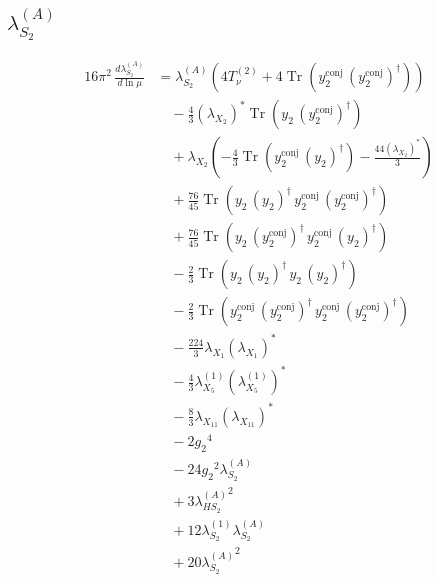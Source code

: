 \documentclass[10pt,a4paper]{article}
\begin{document}
\subsection*{$\lambda_{S_2}^{(A)}$}
\begin{align*}
16\pi^2\,\frac{d \lambda_{S_2}^{(A)}}{d\ln\mu} &={\lambda_{S_2}^{(A)}} (4 T_{\nu}^{(2)}+4 \operatorname{Tr}\!\left({y_{2}^{\mathrm{conj}}}\,\left({y_{2}^{\mathrm{conj}}}\right)^{\dagger}\right)) \\
&\quad -\frac{4}{3} \left({\lambda_{X_{2}}}\right)^{*} \operatorname{Tr}\!\left({y_2}\,\left({y_{2}^{\mathrm{conj}}}\right)^{\dagger}\right) \\
&\quad +{\lambda_{X_{2}}} \left(-\frac{4}{3} \operatorname{Tr}\!\left({y_{2}^{\mathrm{conj}}}\,\left({y_2}\right)^{\dagger}\right)-\frac{44 \left({\lambda_{X_{2}}}\right)^{*}}{3}\right) \\
&\quad +\frac{76}{45} \operatorname{Tr}\!\left({y_2}\,\left({y_2}\right)^{\dagger}\,{y_{2}^{\mathrm{conj}}}\,\left({y_{2}^{\mathrm{conj}}}\right)^{\dagger}\right) \\
&\quad +\frac{76}{45} \operatorname{Tr}\!\left({y_2}\,\left({y_{2}^{\mathrm{conj}}}\right)^{\dagger}\,{y_{2}^{\mathrm{conj}}}\,\left({y_2}\right)^{\dagger}\right) \\
&\quad -\frac{2}{3} \operatorname{Tr}\!\left({y_2}\,\left({y_2}\right)^{\dagger}\,{y_2}\,\left({y_2}\right)^{\dagger}\right) \\
&\quad -\frac{2}{3} \operatorname{Tr}\!\left({y_{2}^{\mathrm{conj}}}\,\left({y_{2}^{\mathrm{conj}}}\right)^{\dagger}\,{y_{2}^{\mathrm{conj}}}\,\left({y_{2}^{\mathrm{conj}}}\right)^{\dagger}\right) \\
&\quad -\frac{224}{3} {\lambda_{X_{1}}} \left({\lambda_{X_{1}}}\right)^{*} \\
&\quad -\frac{4}{3} {\lambda_{X_{5}}^{(1)}} \left({\lambda_{X_{5}}^{(1)}}\right)^{*} \\
&\quad -\frac{8}{3} {\lambda_{X_{11}}} \left({\lambda_{X_{11}}}\right)^{*} \\
&\quad -2 {g_2}^4 \\
&\quad -24 {g_2}^2 {\lambda_{S_2}^{(A)}} \\
&\quad +3 {\lambda_{HS_2}^{(A)}}^2 \\
&\quad +12 {\lambda_{S_2}^{(1)}} {\lambda_{S_2}^{(A)}} \\
&\quad +20 {\lambda_{S_2}^{(A)}}^2 \\
\end{align*}
\end{document}
